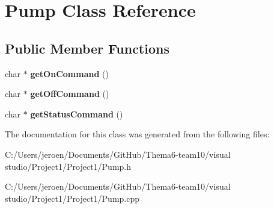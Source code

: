 \hypertarget{class_pump}{}\section{Pump Class Reference}
\label{class_pump}
\subsection*{Public Member Functions}
\begin{DoxyCompactItemize}
\item 
char $\ast$ {\bfseries get\+On\+Command} ()\hypertarget{class_pump_a3e2d31d5c4dc9e6b055102b58c8f4b58}{}\label{class_pump_a3e2d31d5c4dc9e6b055102b58c8f4b58}

\item 
char $\ast$ {\bfseries get\+Off\+Command} ()\hypertarget{class_pump_a82140fe157003d68d9520082f0099b47}{}\label{class_pump_a82140fe157003d68d9520082f0099b47}

\item 
char $\ast$ {\bfseries get\+Status\+Command} ()\hypertarget{class_pump_af5bae93c8022a1b9880d2bfadf81eae3}{}\label{class_pump_af5bae93c8022a1b9880d2bfadf81eae3}

\end{DoxyCompactItemize}


The documentation for this class was generated from the following files\+:\begin{DoxyCompactItemize}
\item 
C\+:/\+Users/jeroen/\+Documents/\+Git\+Hub/\+Thema6-\/team10/visual studio/\+Project1/\+Project1/Pump.\+h\item 
C\+:/\+Users/jeroen/\+Documents/\+Git\+Hub/\+Thema6-\/team10/visual studio/\+Project1/\+Project1/Pump.\+cpp\end{DoxyCompactItemize}

